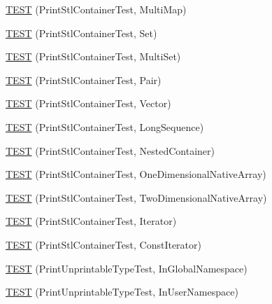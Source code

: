 \begin{DoxyCompactItemize}
\hyperlink{namespacetesting_1_1gtest__printers__test_a8a498c956a5b1c0358d126e1ad56fac0}{\-T\-E\-S\-T} (\-Print\-Stl\-Container\-Test, \-Multi\-Map)
\item 
\hyperlink{namespacetesting_1_1gtest__printers__test_abdc498462741033074f8e86b7c0bd480}{\-T\-E\-S\-T} (\-Print\-Stl\-Container\-Test, \-Set)
\item 
\hyperlink{namespacetesting_1_1gtest__printers__test_adaa3e1cfa3feca377b3958edb41fc0f1}{\-T\-E\-S\-T} (\-Print\-Stl\-Container\-Test, \-Multi\-Set)
\item 
\hyperlink{namespacetesting_1_1gtest__printers__test_ad5d3e873b00c1c9e3f5924e106dd7831}{\-T\-E\-S\-T} (\-Print\-Stl\-Container\-Test, \-Pair)
\item 
\hyperlink{namespacetesting_1_1gtest__printers__test_abfab1ea62f0285c0cdbcca500be0dac8}{\-T\-E\-S\-T} (\-Print\-Stl\-Container\-Test, \-Vector)
\item 
\hyperlink{namespacetesting_1_1gtest__printers__test_a55eca253f3365ad26183bcc711cb257a}{\-T\-E\-S\-T} (\-Print\-Stl\-Container\-Test, \-Long\-Sequence)
\item 
\hyperlink{namespacetesting_1_1gtest__printers__test_ad8fb463805baecdfb95154dec6ec4f27}{\-T\-E\-S\-T} (\-Print\-Stl\-Container\-Test, \-Nested\-Container)
\item 
\hyperlink{namespacetesting_1_1gtest__printers__test_a6dd59bbdea483f662fe62e2c55c106ce}{\-T\-E\-S\-T} (\-Print\-Stl\-Container\-Test, \-One\-Dimensional\-Native\-Array)
\item 
\hyperlink{namespacetesting_1_1gtest__printers__test_aca371c218e2248562ed258eaf385f4d1}{\-T\-E\-S\-T} (\-Print\-Stl\-Container\-Test, \-Two\-Dimensional\-Native\-Array)
\item 
\hyperlink{namespacetesting_1_1gtest__printers__test_a01ec32faf0032f9fbcf4895d8d6e4aa9}{\-T\-E\-S\-T} (\-Print\-Stl\-Container\-Test, \-Iterator)
\item 
\hyperlink{namespacetesting_1_1gtest__printers__test_a3b54f9a039804190b7ff2e818169c0f2}{\-T\-E\-S\-T} (\-Print\-Stl\-Container\-Test, \-Const\-Iterator)
\item 
\hyperlink{namespacetesting_1_1gtest__printers__test_a805264fd24de8e65cba977a798abc54c}{\-T\-E\-S\-T} (\-Print\-Unprintable\-Type\-Test, \-In\-Global\-Namespace)
\item 
\hyperlink{namespacetesting_1_1gtest__printers__test_a0aa1499e978bdde6c71e49ecc9db695b}{\-T\-E\-S\-T} (\-Print\-Unprintable\-Type\-Test, \-In\-User\-Namespace)
\item 

\end{DoxyCompactItemize}
